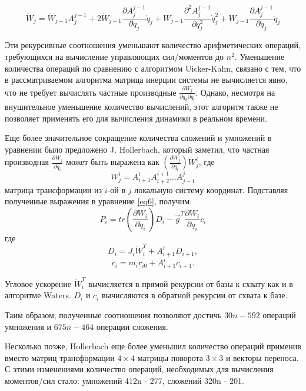 \begin{equation}
\ddot W_j = \ddot W_{j-1} A_j^{j-1} + 2 \dot W_{j-1}
\frac{\partial A_j^{j-1}}{\partial q_j} \dot q_j +
W_{j-1} \frac{\partial^2 A_j^{j-1}}{\partial q_j^2} \dot q_j^2 +
W_{j-1} \frac{\partial A_j^{j-1}}{\partial q_j} \ddot q_j  
\end{equation}

Эти рекурсивные соотношения уменьшают количество арифметических операций, требующихся на вычисление управляющих сил/моментов до $n^2$. Уменьшение количества операций по сравнению с алгоритмом Uicker-Kahn, связано с тем, что в рассматриваемом алгоритма матрица инерции системы не вычисляется явно, что не требует вычислять частные производные $\frac{\partial W_j}{\partial q_k \partial q_l}$. Однако, несмотря на внушительное уменьшение количество вычислений, этот алгоритм также не позволяет применять его для вычисления динамики в реальном времени.

Еще более значительное сокращение количества сложений и умножений в уравнении было предложено J. Hollerbach, который заметил, что частная производная $\frac{\partial W_j}{\partial q_i}$ может быть выражена как $(\frac{\partial W_j}{\partial q_i}) W_j^i$, где
\begin{equation}
W_j^i = A_{i+1}^{i} A_{i+2}^{i+1} ... A_{j-1}^j
\end{equation}
матрица трансформации из $i$-ой в $j$ локальную систему координат. Подставляя полученные выражения в уравнение \ref{eq6}, получим:
\begin{equation}
P_i = tr(\frac{\partial W_i}{\partial q_i}) D_i -
\vec{g}^T \frac{\partial W_i}{\partial q_i} c_i
\end{equation}
где 
\begin{equation}
D_i = J_i \ddot W_i^T + A_{i+1}^{i} D_{i+1},
\end{equation}
\begin{equation}
c_i = m_i r_{i0} + A_{i+1}^{i} c_{i+1}.
\end{equation}

Угловое ускорение $\ddot W_i^T$ вычисляется в прямой рекурсии от базы к схвату как и в алгоритме Waters. $D_i$ и $c_i$ вычисляются в обратной рекурсии от схвата к базе.

Таим образом, полученные соотношения позволяют достичь $30n-592$ операций умножения и $675n - 464$ операции сложения.

Несколько позже, Hollerbach еще более уменьшил количество операций применив вместо матриц трансформации $4 \times 4$ матрицы поворота $3 \times 3$ и векторы переноса. С этими изменениями количество операций, необходимых для вычисления моментов/сил стало: умножений 412n - 277, сложений 320n - 201.

